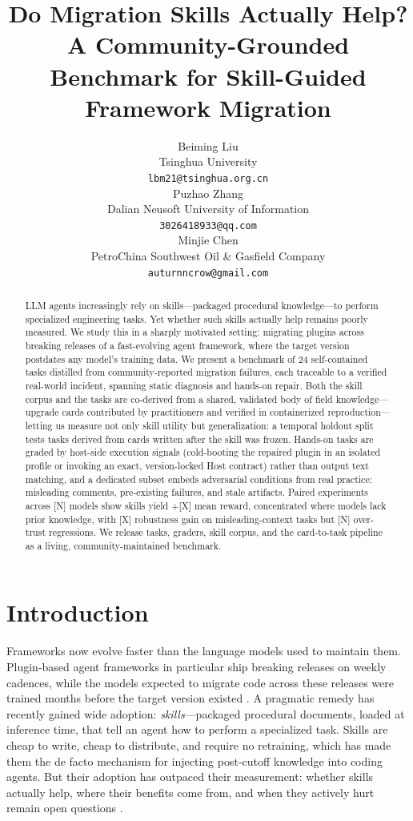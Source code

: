 \documentclass[11pt]{article}
\title{Do Migration Skills Actually Help? A Community-Grounded Benchmark for Skill-Guided Framework Migration}
\author{Beiming Liu \\
  Tsinghua University \\
  \texttt{lbm21@tsinghua.org.cn} \\
  \And
  Puzhao Zhang \\
  Dalian Neusoft University of Information \\
  \texttt{3026418933@qq.com} \\
  \And
  Minjie Chen \\
  PetroChina Southwest Oil \& Gasfield Company \\
  \texttt{auturnncrow@gmail.com} \\}
\begin{document}
\maketitle
\begin{abstract}
LLM agents increasingly rely on skills---packaged procedural knowledge---to perform specialized engineering tasks.
Yet whether such skills actually help remains poorly measured.
We study this in a sharply motivated setting: migrating plugins across breaking releases of a fast-evolving agent framework, where the target version postdates any model's training data.
We present a benchmark of 24 self-contained tasks distilled from community-reported migration failures, each traceable to a verified real-world incident, spanning static diagnosis and hands-on repair.
Both the skill corpus and the tasks are co-derived from a shared, validated body of field knowledge---upgrade cards contributed by practitioners and verified in containerized reproduction---letting us measure not only skill utility but generalization: a temporal holdout split tests tasks derived from cards written after the skill was frozen.
Hands-on tasks are graded by host-side execution signals (cold-booting the repaired plugin in an isolated profile or invoking an exact, version-locked Host contract) rather than output text matching, and a dedicated subset embeds adversarial conditions from real practice: misleading comments, pre-existing failures, and stale artifacts.
Paired experiments across [N] models show skills yield +[X] mean reward, concentrated where models lack prior knowledge, with [X] robustness gain on misleading-context tasks but [N] over-trust regressions.
We release tasks, graders, skill corpus, and the card-to-task pipeline as a living, community-maintained benchmark.
\end{abstract}

\section{Introduction}

Frameworks now evolve faster than the language models used to maintain them.
Plugin-based agent frameworks in particular ship breaking releases on weekly cadences, while the models expected to migrate code across these releases were trained months before the target version existed \citep{llmlag}.
A pragmatic remedy has recently gained wide adoption: \emph{skills}---packaged procedural documents, loaded at inference time, that tell an agent how to perform a specialized task.
Skills are cheap to write, cheap to distribute, and require no retraining, which has made them the de facto mechanism for injecting post-cutoff knowledge into coding agents.
But their adoption has outpaced their measurement: whether skills actually help, where their benefits come from, and when they actively hurt remain open questions \citep{skillsbench,skilluse,skillsharmful}.
\end{document}
